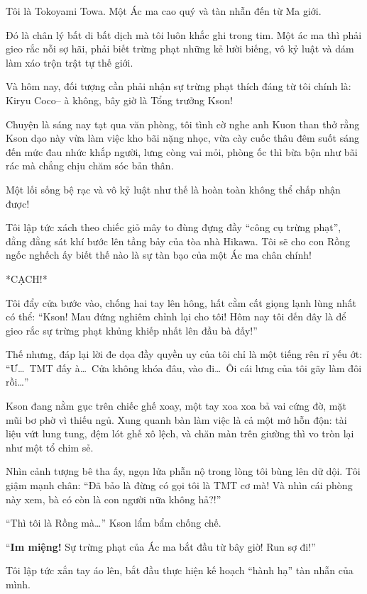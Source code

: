 \documentclass[../main.tex]{subfiles}
\begin{document}

Tôi là Tokoyami Towa. Một Ác ma cao quý và tàn nhẫn đến từ Ma giới.

Đó là chân lý bất di bất dịch mà tôi luôn khắc ghi trong tim. Một ác ma thì phải gieo rắc nỗi sợ hãi, phải biết trừng phạt những kẻ lười biếng, vô kỷ luật và dám làm xáo trộn trật tự thế giới.

Và hôm nay, đối tượng cần phải nhận sự trừng phạt thích đáng từ tôi chính là: Kiryu Coco-- à không, bây giờ là Tổng trưởng Kson!

Chuyện là sáng nay tạt qua văn phòng, tôi tình cờ nghe anh Kuon than thở rằng Kson dạo này vừa làm việc kho bãi nặng nhọc, vừa cày cuốc thâu đêm suốt sáng đến mức đau nhức khắp người, lưng còng vai mỏi, phòng ốc thì bừa bộn như bãi rác mà chẳng chịu chăm sóc bản thân.

Một lối sống bệ rạc và vô kỷ luật như thế là hoàn toàn không thể chấp nhận được!

Tôi lập tức xách theo chiếc giỏ mây to đùng đựng đầy ``công cụ trừng phạt'', đằng đằng sát khí bước lên tầng bảy của tòa nhà Hikawa. Tôi sẽ cho con Rồng ngốc nghếch ấy biết thế nào là sự tàn bạo của một Ác ma chân chính!

*CẠCH!*

Tôi đẩy cửa bước vào, chống hai tay lên hông, hất cằm cất giọng lạnh lùng nhất có thể: ``Kson! Mau đứng nghiêm chỉnh lại cho tôi! Hôm nay tôi đến đây là để gieo rắc sự trừng phạt khủng khiếp nhất lên đầu bà đấy!''

Thế nhưng, đáp lại lời đe dọa đầy quyền uy của tôi chỉ là một tiếng rên rỉ yếu ớt: ``Ư\dots\ TMT đấy à\dots\ Cửa không khóa đâu, vào đi\dots\ Ôi cái lưng của tôi gãy làm đôi rồi\dots''

Kson đang nằm gục trên chiếc ghế xoay, một tay xoa xoa bả vai cứng đờ, mặt mũi bơ phờ vì thiếu ngủ. Xung quanh bàn làm việc là cả một mớ hỗn độn: tài liệu vứt lung tung, đệm lót ghế xô lệch, và chăn màn trên giường thì vo tròn lại như một tổ chim sẻ.

Nhìn cảnh tượng bê tha ấy, ngọn lửa phẫn nộ trong lòng tôi bùng lên dữ dội. Tôi giậm mạnh chân: ``Đã bảo là đừng có gọi tôi là TMT cơ mà! Và nhìn cái phòng này xem, bà có còn là con người nữa không hả?!''

``Thì tôi là Rồng mà\dots'' Kson lẩm bẩm chống chế.

``\textbf{Im miệng!} Sự trừng phạt của Ác ma bắt đầu từ bây giờ! Run sợ đi!''

Tôi lập tức xắn tay áo lên, bắt đầu thực hiện kế hoạch ``hành hạ'' tàn nhẫn của mình.
\end{document}
